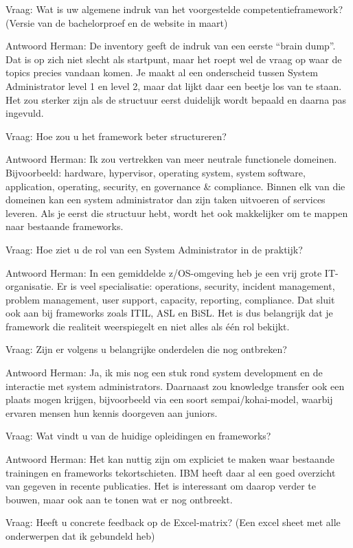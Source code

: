 Vraag: Wat is uw algemene indruk van het voorgestelde competentieframework? (Versie van de bachelorproef en de website in maart)

Antwoord Herman: De inventory geeft de indruk van een eerste “brain dump”. Dat is op zich niet slecht als startpunt, maar het roept wel de vraag op waar de topics precies vandaan komen. Je maakt al een onderscheid tussen System Administrator level 1 en level 2, maar dat lijkt daar een beetje los van te staan. Het zou sterker zijn als de structuur eerst duidelijk wordt bepaald en daarna pas ingevuld.

Vraag: Hoe zou u het framework beter structureren?

Antwoord Herman: Ik zou vertrekken van meer neutrale functionele domeinen. Bijvoorbeeld: hardware, hypervisor, operating system, system software, application, operating, security, en governance \& compliance. Binnen elk van die domeinen kan een system administrator dan zijn taken uitvoeren of services leveren. Als je eerst die structuur hebt, wordt het ook makkelijker om te mappen naar bestaande frameworks.

Vraag: Hoe ziet u de rol van een System Administrator in de praktijk?

Antwoord Herman: In een gemiddelde z/OS-omgeving heb je een vrij grote IT-organisatie. Er is veel specialisatie: operations, security, incident management, problem management, user support, capacity, reporting, compliance. Dat sluit ook aan bij frameworks zoals ITIL, ASL en BiSL. Het is dus belangrijk dat je framework die realiteit weerspiegelt en niet alles als één rol bekijkt.

Vraag: Zijn er volgens u belangrijke onderdelen die nog ontbreken?

Antwoord Herman: Ja, ik mis nog een stuk rond system development en de interactie met system administrators. Daarnaast zou knowledge transfer ook een plaats mogen krijgen, bijvoorbeeld via een soort sempai/kohai-model, waarbij ervaren mensen hun kennis doorgeven aan juniors.

Vraag: Wat vindt u van de huidige opleidingen en frameworks?

Antwoord Herman: Het kan nuttig zijn om expliciet te maken waar bestaande trainingen en frameworks tekortschieten. IBM heeft daar al een goed overzicht van gegeven in recente publicaties. Het is interessant om daarop verder te bouwen, maar ook aan te tonen wat er nog ontbreekt.

Vraag: Heeft u concrete feedback op de Excel-matrix? (Een excel sheet met alle onderwerpen dat ik gebundeld heb)

